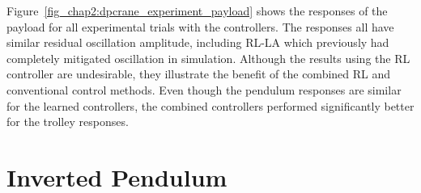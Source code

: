 Figure~\ref{fig_chap2:dpcrane_experiment_payload} shows the responses of the payload for all experimental trials with the controllers. The responses all have similar residual oscillation amplitude, including RL-LA which previously had completely mitigated oscillation in simulation.
%
Although the results using the RL controller are undesirable, they illustrate the benefit of the combined RL and conventional control methods. Even though the pendulum responses are similar for the learned controllers, the combined controllers performed significantly better for the trolley responses.

\section{Inverted Pendulum}
